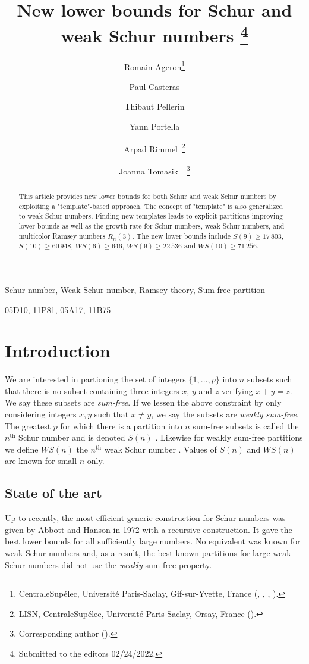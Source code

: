 \documentclass[final,onefignum,onetabnum]{siamart190516}
\title{New lower bounds for Schur and weak Schur numbers \thanks{Submitted to the editors 02/24/2022.}}
\author{Romain Ageron\thanks{CentraleSup\'elec, Universit\'e{} Paris-Saclay, Gif-sur-Yvette, France
	(\email{romain.ageron@student-cs.fr}, \email{paul.casteras@student-cs.fr},
	\email{thibaut.pellerin@student-cs.fr}, \email{yann.portella@student-cs.fr}).}
\and Paul Casteras\footnotemark[2]
\and Thibaut Pellerin\footnotemark[2]
\and Yann Portella\footnotemark[2]
\and Arpad Rimmel\footnotemark[2]\ \thanks{LISN, CentraleSup\'elec, Universit\'e{} Paris-Saclay, Orsay, France
	(\email{arpad.rimmel@centralesupelec.fr}).}
\and Joanna Tomasik\footnotemark[2]\ \footnotemark[3]\ \thanks{Corresponding author
	(\email{joanna.tomasik@centralesupelec.fr}).}}
\newcommand{\WS}{\mathit{WS}}
\begin{document}
\maketitle

\begin{abstract}
This article provides new lower bounds for both Schur and weak Schur numbers by exploiting a "template"-based approach.
The concept of "template" is also generalized to weak Schur numbers. Finding new templates leads to explicit partitions
improving lower bounds as well as the growth rate for Schur numbers, weak Schur numbers, and multicolor Ramsey numbers \(R_n(3)\).
The new lower bounds include \(S(9) \geqslant 17\,803\), \(S(10) \geqslant 60\,948\), \(\WS(6) \geqslant 646\),
\(\WS (9) \geqslant 22\,536\) and \(\WS (10) \geqslant 71\,256 \).
\end{abstract}

\begin{keywords}
	Schur number, Weak Schur number, Ramsey theory, Sum-free partition
\end{keywords}

\begin{AMS}
	05D10, 11P81, 05A17, 11B75
\end{AMS}

\section{Introduction}

We are interested in partioning the set of integers \(\{1, ..., p\}\) into \(n\) subsets such that there is no
subset containing three integers \(x\), \(y\) and \(z\) verifying \(x + y = z\). We say these subsets are
\textit{sum-free}. If we lessen the above constraint by only considering integers \(x,y\) such that \(x \neq y\), we say the subsets are \textit{weakly sum-free}. The
greatest \(p\) for which there is a partition into \(n\) sum-free subsets is called the \(n^{\text{th}}\) Schur
number and is denoted \(S(n)\) \cite{Schur1917}. Likewise for weakly sum-free partitions we define \(\WS(n)\)
the \(n^{\text{th}}\) weak Schur number \cite{Irving1973}. Values of \(S(n)\) and \(\WS(n)\) are known for small \(n\) only.


\subsection{State of the art}

Up to recently, the most efficient generic construction for Schur numbers was given by Abbott and Hanson
\cite{AbbottHanson} in 1972 with a recursive construction. It gave the best lower bounds for all sufficiently large
numbers. No equivalent was known for weak Schur numbers and, as a result, the best known partitions for large
weak Schur numbers did not use the \textit{weakly} sum-free property.
\end{document}
